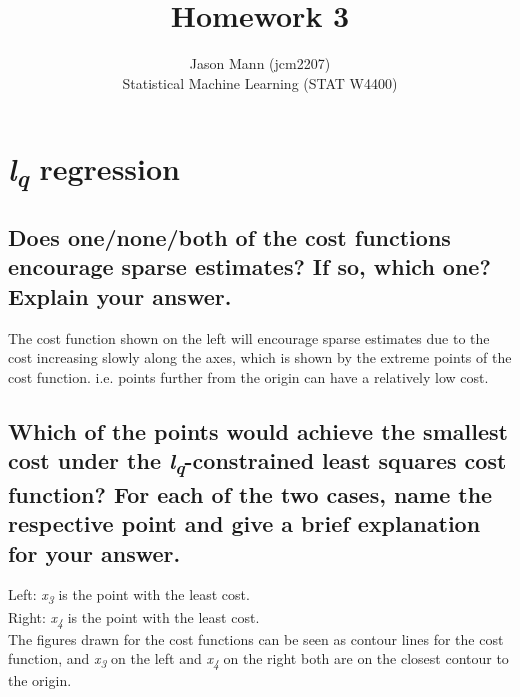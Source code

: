 \documentclass[11pt]{article}
\theoremstyle{quest}
\newcommand{\problem}[1]{\section{#1}}        %
\newcommand{\subproblem}[1]{\subsection{#1}}      %
\newcommand{\Sub}{\textsubscript}
\begin{document}
 
 
\title{Homework 3}
\author{\small{Jason Mann (jcm2207)}\\
\small{Statistical Machine Learning (STAT W4400)}}
\date{}
 
\maketitle


\problem{\textit{l\Sub{q}} regression}

\subproblem{Does one/none/both of the cost functions encourage sparse estimates? If so, which one? Explain your answer.}


\begin{adjustwidth}{3.5em}{0em}
The cost function shown on the left will encourage sparse estimates due to the cost increasing slowly along the axes, which is shown by the extreme points of the cost function. i.e. points further from the origin can have a relatively low cost.
\end{adjustwidth}

\subproblem{Which of the points would achieve the smallest cost under the \textit{l\Sub{q}}-constrained least squares cost function? For each of the two cases, name the respective point and give a brief explanation for your answer.}

\begin{adjustwidth}{3.5em}{0em}
Left: \textit{x\Sub{3}} is the point with the least cost. \\
Right: \textit{x\Sub{4}} is the point with the least cost. \\
The figures drawn for the cost functions can be seen as contour lines for the cost function, and \textit{x\Sub{3}} on the left and \textit{x\Sub{4}} on the right both are on the closest contour to the origin.
\end{adjustwidth}

\end{document}

